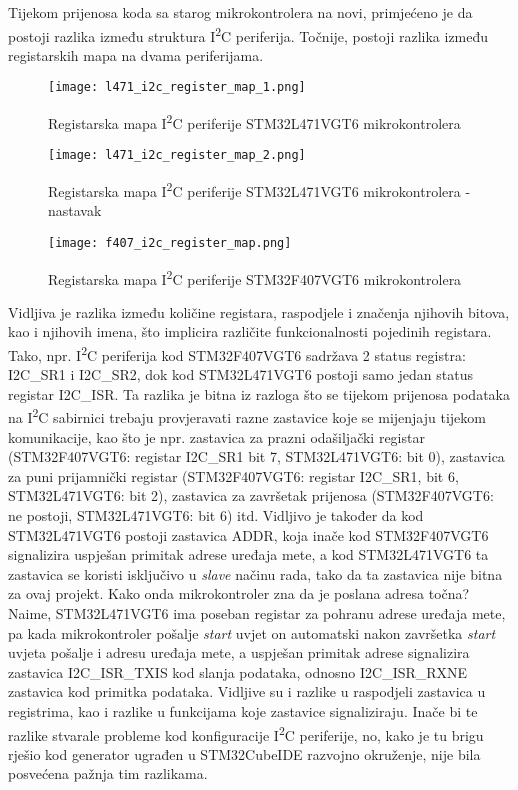 Tijekom prijenosa koda sa starog mikrokontrolera na novi, primjećeno je da postoji razlika između struktura I\textsuperscript{2}C periferija. Točnije, postoji razlika između registarskih mapa na dvama periferijama.
\begin{figure}[H]
	\centering
	\texttt{[image: l471\_i2c\_register\_map\_1.png]}
	\caption{Registarska mapa I\textsuperscript{2}C periferije STM32L471VGT6
	mikrokontrolera \cite{l471_manual}}
	\label{fig:l471_i2c_register_map_1}
\end{figure}
\begin{figure}[H]
	\centering
	\texttt{[image: l471\_i2c\_register\_map\_2.png]}
	\caption{Registarska mapa I\textsuperscript{2}C periferije STM32L471VGT6
	mikrokontrolera - nastavak \cite{l471_manual}}
	\label{fig:l471_i2c_register_map_1407_i2c_diagram}
\end{figure}
\begin{figure}[H]
	\centering
	\texttt{[image: f407\_i2c\_register\_map.png]}
	\caption{Registarska mapa I\textsuperscript{2}C periferije STM32F407VGT6
	mikrokontrolera\cite{f407_manual}}
	\label{fig:f407_i2c_diagram}
\end{figure}
Vidljiva je razlika između količine registara, raspodjele i značenja njihovih bitova, kao i njihovih imena, što implicira različite funkcionalnosti pojedinih registara. Tako, npr. I\textsuperscript{2}C periferija kod STM32F407VGT6 sadržava 2 status registra: I2C\_SR1 i I2C\_SR2, dok kod STM32L471VGT6 postoji samo jedan status registar I2C\_ISR. Ta razlika je bitna iz razloga što se tijekom prijenosa podataka na I\textsuperscript{2}C sabirnici trebaju provjeravati razne zastavice koje se mijenjaju tijekom komunikacije, kao što je npr. zastavica za prazni odašiljački registar (STM32F407VGT6: registar I2C\_SR1 bit 7, STM32L471VGT6: bit 0), zastavica za puni prijamnički registar (STM32F407VGT6: registar I2C\_SR1, bit 6, STM32L471VGT6: bit 2), zastavica za završetak prijenosa (STM32F407VGT6: ne postoji, STM32L471VGT6: bit 6) itd. Vidljivo je također da kod STM32L471VGT6 postoji zastavica ADDR, koja inače kod STM32F407VGT6 signalizira uspješan primitak adrese uređaja mete, a kod STM32L471VGT6 ta zastavica se koristi isključivo u \textit{slave} načinu rada, tako da ta zastavica nije bitna za ovaj projekt. Kako onda mikrokontroler zna da je poslana adresa točna? Naime, STM32L471VGT6 ima poseban registar za pohranu adrese uređaja mete, pa kada mikrokontroler pošalje \textit{start} uvjet on automatski nakon završetka \textit{start} uvjeta pošalje i adresu uređaja mete, a uspješan primitak adrese signalizira zastavica I2C\_ISR\_TXIS kod slanja podataka, odnosno I2C\_ISR\_RXNE zastavica kod primitka podataka. Vidljive su i razlike u raspodjeli zastavica u registrima, kao i razlike u funkcijama koje zastavice signaliziraju. Inače bi te razlike stvarale probleme kod konfiguracije I\textsuperscript{2}C periferije, no, kako je tu brigu rješio kod generator ugrađen u STM32CubeIDE razvojno okruženje, nije bila posvećena pažnja tim razlikama.